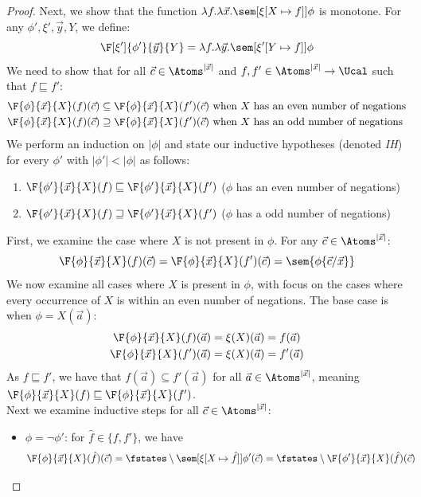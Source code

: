 \begin{proof}
	Next, we show that the function $\lambda f.\lambda \vec x.\sem[{\xi[X\mapsto f]}]{\phi}$ is monotone.
	For any $\phi',\xi', \vec y, Y$, we define:
	\[\F[\xi']{\phi'}{\vec y}{Y} = \lambda f.\lambda \vec y.\sem[{\xi'[Y\mapsto f]}]{\phi}\]
	 We need to show that for all $\vec c \in \Atoms^{|\vec x|}$
	and $f, f'\in \Atoms^{|\vec x|} \rightarrow \Ucal$ such that $f \sqsubseteq f'$: 
	\begin{align*}
		\F{\phi}{\vec x}{X}(f)(\vec c) \subseteq \F{\phi}{\vec x}{X}(f')(\vec c) &\text{ when $X$ has an even number of negations}\\
		\F{\phi}{\vec x}{X}(f)(\vec c) \supseteq \F{\phi}{\vec x}{X}(f')(\vec c) &\text{ when $X$ has an odd number of negations}
	\end{align*}
	We perform an induction on $|\phi|$
	and state our inductive hypotheses (denoted \textit{IH}) for every $\phi'$ with $|\phi'| < |\phi|$ as follows:
	\begin{enumerate}
		\item $\F{\phi'}{\vec x}{X}(f) \sqsubseteq \F{\phi'}{\vec x}{X}(f')$ ($\phi$ has an even
		number of negations)
		\item $\F{\phi'}{\vec x}{X}(f) \sqsupseteq \F{\phi'}{\vec x}{X}(f')$ ($\phi$ has a odd number of negations)
	\end{enumerate}
	First, we examine the case where $X$ is not present in $\phi$. For any $\vec c \in \Atoms^{|\vec x|}$:
	\[
	\F{\phi}{\vec x}{X}(f)(\vec c) = \F{\phi}{\vec x}{X}(f')(\vec c) = \sem{\phi\{\vec c / \vec x\}}
	\]
	We now examine all cases where $X$ is present in $\phi$, with focus on the cases where every occurrence of $X$ is within an even number of negations. 
	The base case is when $\phi = X(\vec a)$:
	\begin{align*}
		\F{\phi}{\vec x}{X}(f)(\vec a) &= \xi(X)(\vec a) = f(\vec a)\\
		\F{\phi}{\vec x}{X}(f')(\vec a) &= \xi(X)(\vec a) = f'(\vec a)
	\end{align*}
	As $f\sqsubseteq f'$, we have that $f(\vec a) \subseteq f'(\vec a)$ for all $\vec a \in \Atoms^{|\vec x|}$, 
	meaning $\F{\phi}{\vec x}{X}(f) \sqsubseteq \F{\phi}{\vec x}{X}(f')$.\\
	Next we examine inductive steps for all $\vec c \in \Atoms^{|\vec x|}$:
	\begin{itemize}
		\item $\phi = \lnot \phi'$: for $\hat f \in \{f, f'\}$, we have
		\begin{align*}
			&\F{\phi}{\vec x}{X}(\hat  f)(\vec c)  = \fstates \setminus \sem[{\xi[X \mapsto \hat f]}]{\phi'(\vec c)} =  \fstates \setminus \F{\phi'}{\vec x}{X}(\hat f)(\vec c)

\end{align*}
\end{itemize}
\end{proof}
